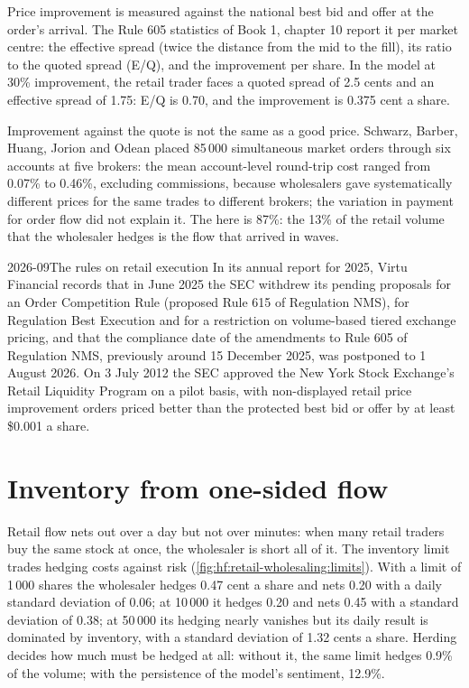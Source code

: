 Price improvement is measured against the national best bid and offer at the order's arrival. The Rule 605 statistics of Book 1, chapter 10 report it
per market centre: the effective spread (twice the distance from the mid to the fill), its ratio to the quoted spread (E/Q), and the improvement per
share. In the model at 30\% improvement, the retail trader faces a quoted spread of 2.5 cents and an effective spread of 1.75: E/Q is 0.70, and the
improvement is 0.375 cent a share.

Improvement against the quote is not the same as a good price. Schwarz, Barber, Huang, Jorion and Odean placed 85\,000 simultaneous market orders
through six accounts at five brokers: the mean account-level round-trip cost ranged from 0.07\% to 0.46\%, excluding commissions, because
wholesalers gave systematically different prices for the same trades to different brokers; the variation in payment for order flow did not explain
it. The  here is 87\%: the 13\% of the retail volume that the wholesaler hedges is the flow that arrived in waves.

\begin{dated}{2026-09}{The rules on retail execution}\label{dat:hf:retail-wholesaling:rules}
In its annual report for 2025, Virtu Financial records that in June 2025 the SEC withdrew its pending proposals for an Order Competition Rule
(proposed Rule 615 of Regulation NMS), for Regulation Best Execution and for a restriction on volume-based tiered exchange pricing, and that the
compliance date of the amendments to Rule 605 of Regulation NMS, previously around 15 December 2025, was postponed to 1 August 2026. On 3 July
2012 the SEC approved the New York Stock Exchange's Retail Liquidity Program on a pilot basis, with non-displayed retail price improvement orders
priced better than the protected best bid or offer by at least \$0.001 a share.
\end{dated}

\section{Inventory from one-sided flow}

Retail flow nets out over a day but not over minutes: when many retail traders buy the same stock at once, the wholesaler is short all of it. The
inventory limit trades hedging costs against risk (\cref{fig:hf:retail-wholesaling:limits}). With a limit of 1\,000 shares the wholesaler hedges 0.47
cent a share and nets 0.20 with a daily standard deviation of 0.06; at 10\,000 it hedges 0.20 and nets 0.45 with a standard deviation of 0.38; at 50\,000
its hedging nearly vanishes but its daily result is dominated by inventory, with a standard deviation of 1.32 cents a share. Herding decides how much
must be hedged at all: without it, the same limit hedges 0.9\% of the volume; with the persistence of the model's sentiment, 12.9\%.


